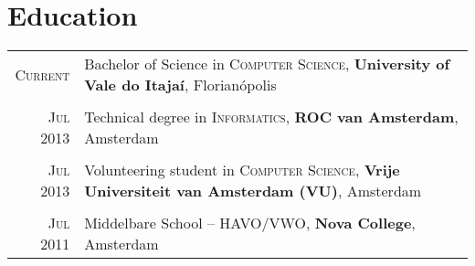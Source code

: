 \documentclass[a4paper,10pt]{article}
\begin{document}
\section{Education}
\begin{longtable}{r|p{11cm}}

\textsc{Current} & Bachelor of Science in \textsc{Computer Science}, \textbf{University of Vale do Itajaí}, Florianópolis \\ \\

\textsc{Jul} 2013& Technical degree in \textsc{Informatics}, \normalsize\textbf{ROC van Amsterdam}, Amsterdam \\ \\

\textsc{Jul} 2013& Volunteering student in \textsc{Computer Science}, \normalsize\textbf{Vrije Universiteit van Amsterdam (VU)}, Amsterdam \\ \\

\textsc{Jul} 2011 & Middelbare School – HAVO/VWO, \normalsize\textbf{Nova College}, Amsterdam \\

\end{longtable}

\end{document}
